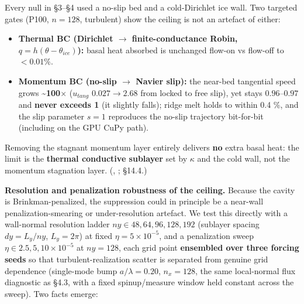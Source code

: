 \documentclass[11pt]{article}
\begin{document}
Every null in §3–§4 used a no-slip bed and a cold-Dirichlet ice wall. Two targeted gates (P100, $n=128$, turbulent) show the ceiling is not an artefact of either:


\begin{itemize}
\item \textbf{Thermal BC (Dirichlet \ensuremath{\to} finite-conductance Robin, $q=h(\theta -\theta _{ice})$):} basal heat absorbed is unchanged flow-on vs flow-off to \textbf{$<0.01\%$}.
\item \textbf{Momentum BC (no-slip \ensuremath{\to} Navier slip):} the near-bed tangential speed grows \textbf{\textasciitilde{}100\ensuremath{\times}} ($u_{tang}$ $0.027 \to  2.68$ from locked to free slip), yet  stays $0.96–0.97$ and \textbf{never exceeds 1} (it slightly falls); ridge melt holds to within 0.4 \%, and the slip parameter $s=1$ reproduces the no-slip trajectory bit-for-bit (including on the GPU CuPy path).
\end{itemize}


Removing the stagnant momentum layer entirely delivers \textbf{no} extra basal heat: the limit is the \textbf{thermal conductive sublayer} set by $\kappa $ and the cold wall, not the momentum stagnation layer. (, ;  §14.4.)


\textbf{Resolution and penalization robustness of the ceiling.} Because the cavity is Brinkman-penalized, the suppression could in principle be a near-wall penalization-smearing or under-resolution artefact. We test this directly with a wall-normal resolution ladder $ny\in {48,64,96,128,192}$ (sublayer spacing $dy=L_{y}/ny$, $L_{y}=2\pi $) at fixed $\eta =5\times 10^{-5}$, and a penalization sweep $\eta \in {2.5,5,10}\times 10^{-5}$ at $ny=128$, each grid point \textbf{ensembled over three forcing seeds} so that turbulent-realization scatter is separated from genuine grid dependence (single-mode bump $a/\lambda =0.20$, $n_{x}=128$, the same local-normal flux diagnostic as §4.3, with a fixed spinup/measure window held constant across the sweep). Two facts emerge:
\end{document}
